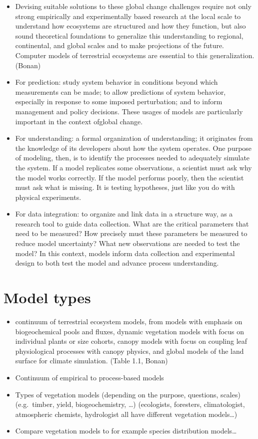\documentclass[
  oneside]{book}
\providecommand{\tightlist}{%
  \setlength{\itemsep}{0pt}\setlength{\parskip}{0pt}}
\begin{document}
\begin{itemize}
\tightlist
\item
  Devising suitable solutions to these global change challenges require not only strong empirically and experimentally based research at the local scale to understand how ecosystems are structured and how they function, but also sound theoretical foundations to generalize this understanding to regional, continental, and global scales and to make projections of the future. Computer models of terrestrial ecosystems are essential to this generalization. (Bonan)
\item
  For prediction: study system behavior in conditions beyond which measurements can be made; to allow predictions of system behavior, especially in response to some imposed perturbation; and to inform management and policy decisions. These usages of models are particularly important in the context ofglobal change.
\item
  For understanding: a formal organization of understanding; it originates from the knowledge of its developers about how the system operates. One purpose of modeling, then, is to identify the processes needed to adequately simulate the system. If a model replicates some observations, a scientist must ask why the model works correctly. If the model performs poorly, then the scientist
  must ask what is missing. It is testing hypotheses, just like you do with physical experiments.
\item
  For data integration: to organize and link data in a structure way, as a research tool to guide data collection. What are the critical parameters that need to be measured? How precisely must these parameters be measured to reduce model uncertainty? What new observations are needed to test the model? In this context, models inform data collection and experimental design to both test the model and advance process understanding.
\end{itemize}

\hypertarget{model-types}{%
\section{Model types}\label{model-types}}

\begin{itemize}
\tightlist
\item
  continuum of terrestrial ecosystem models, from models with emphasis on biogeochemical pools and fluxes, dynamic vegetation models with focus on individual plants or size cohorts, canopy models with focus on coupling leaf physiological processes with canopy physics, and global models of the land surface for climate simulation. (Table 1.1, Bonan)
\item
  Continuum of empirical to process-based models
\item
  Types of vegetation models (depending on the purpose, questions, scales) (e.g.~timber, yield, biogeochemistry, \ldots) (ecologists, foresters, climatologist, atmospheric chemists, hydrologist all have different vegetation models\ldots)
\item
  Compare vegetation models to for example species distribution models\ldots{}
\end{itemize}
\end{document}
